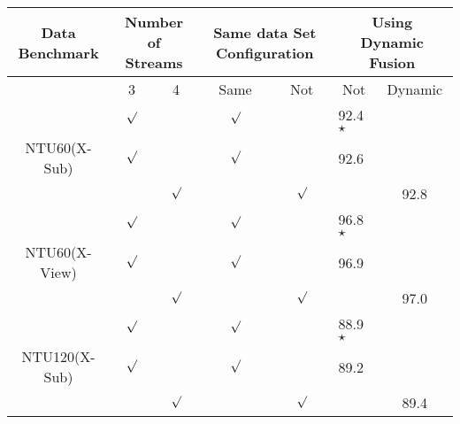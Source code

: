 \documentclass[letterpaper]{article} \usepackage[submission]{aaai23}  \usepackage{times}  \usepackage{helvet}  \usepackage{courier}  \usepackage[hyphens]{url}  \usepackage{graphicx} \urlstyle{rm} \def\UrlFont{\rm}  \usepackage{natbib}  \usepackage{caption} \frenchspacing  \setlength{\pdfpagewidth}{8.5in} \setlength{\pdfpageheight}{11in} \usepackage{algorithm}
\begin{document}
\begin{table*}[ht]
 \centering
\begin{tabular}{cccclll}
\hline\noalign{\smallskip}
Data Benchmark                                     & \multicolumn{2}{c}{Number of Streams}             &\multicolumn{2}{c}{Same data Set Configuration}  & \multicolumn{2}{c}{Using Dynamic Fusion}                \\ \hline
                                                   & 3                      & 4                      & Same                   & \multicolumn{1}{c}{Not} & \multicolumn{1}{c}{Not}   & \multicolumn{1}{c}{Dynamic} \\ \hline
\multicolumn{1}{c}{} & \multicolumn{1}{c}{$\surd$} & \multicolumn{1}{c}{}  & \multicolumn{1}{c}{$\surd$} & \multicolumn{1}{l}{}   & \multicolumn{1}{l}{92.4$\star 
$} & \multicolumn{1}{l}{}       \\ 
\multicolumn{1}{c}{{NTU60(X-Sub)}}                              & \multicolumn{1}{c}{$\surd$} & \multicolumn{1}{c}{}  & \multicolumn{1}{c}{$\surd$} & \multicolumn{1}{l}{}   & \multicolumn{1}{l}{92.6} & \multicolumn{1}{l}{}       \\ 
\multicolumn{1}{c}{}                              & \multicolumn{1}{l}{}  & \multicolumn{1}{c}{$\surd$} & \multicolumn{1}{c}{}  & \multicolumn{1}{c}{$\surd$}  & \multicolumn{1}{l}{}     & \multicolumn{1}{c}{92.8}   \\ \hline

\multicolumn{1}{c}{} & \multicolumn{1}{c}{$\surd$} & \multicolumn{1}{c}{}  & \multicolumn{1}{c}{$\surd$} & \multicolumn{1}{l}{}   & \multicolumn{1}{l}{96.8$\star 
$} & \multicolumn{1}{l}{}       \\ 
\multicolumn{1}{c}{{NTU60(X-View)}}                              & \multicolumn{1}{c}{$\surd$} & \multicolumn{1}{c}{}  & \multicolumn{1}{c}{$\surd$} & \multicolumn{1}{l}{}   & \multicolumn{1}{l}{96.9} & \multicolumn{1}{l}{}       \\ 
\multicolumn{1}{c}{}                              & \multicolumn{1}{l}{}  & \multicolumn{1}{c}{$\surd$} & \multicolumn{1}{c}{}  & \multicolumn{1}{c}{$\surd$}  & \multicolumn{1}{l}{}     & \multicolumn{1}{c}{97.0}   \\ \hline

\multicolumn{1}{c}{} & \multicolumn{1}{c}{$\surd$} & \multicolumn{1}{c}{}  & \multicolumn{1}{c}{$\surd$} & \multicolumn{1}{l}{}   & \multicolumn{1}{l}{88.9$\star 
$} & \multicolumn{1}{l}{}       \\ 
\multicolumn{1}{c}{{NTU120(X-Sub)}}                              & \multicolumn{1}{c}{$\surd$} & \multicolumn{1}{c}{}  & \multicolumn{1}{c}{$\surd$} & \multicolumn{1}{l}{}   & \multicolumn{1}{l}{89.2} & \multicolumn{1}{l}{}       \\ 
\multicolumn{1}{c}{}                              & \multicolumn{1}{l}{}  & \multicolumn{1}{c}{$\surd$} & \multicolumn{1}{c}{}  & \multicolumn{1}{c}{$\surd$}  & \multicolumn{1}{l}{}     & \multicolumn{1}{c}{89.4}   \\ \hline


\end{tabular}
\end{table*}
\end{document}
